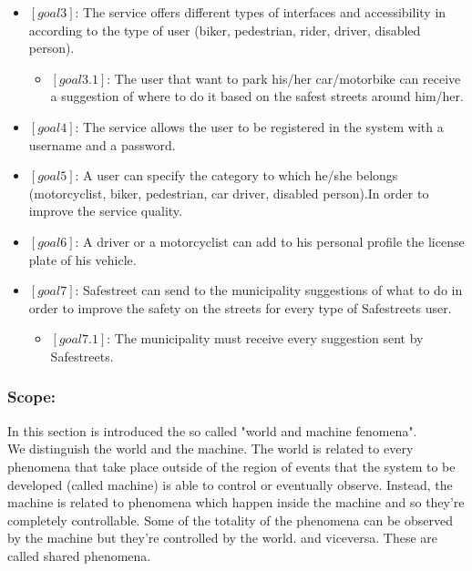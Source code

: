 \documentclass[titlepage]{article}
\begin{document}
\begin{itemize}
\begin{itemize}
      \end{itemize}
\item $[goal 3]$: The service offers different types of 						  interfaces and accessibility in according 					  to the type of user (biker, pedestrian, 						  rider, driver, disabled person).
	\begin{itemize}
	\item $[goal 3.1]$: The user that want to park his/her  							car/motorbike can receive a                           						suggestion of where to do it 
						based on the safest streets around 								him/her.\\
	\end{itemize}

\item $[goal 4]$: The service allows the user to be 							  registered in the system with a username 				  		  and a password.\\

\item $[goal 5]$: A user can specify the category to which 						  he/she belongs (motorcyclist, biker, 							  pedestrian, car driver, disabled person).In 				  order to improve the service quality.\\

\item $[goal 6]$: A driver or a motorcyclist can add to his 					  personal profile the license plate of his 					  vehicle.\\

\item $[goal 7]$: Safestreet can send to the municipality 						  suggestions of what to do in order to 						  improve the safety on the streets for every 
				  type of Safestreets user.
	\begin{itemize}
	\item $[goal 7.1]$: The municipality must receive every 
					    suggestion sent by Safestreets.\\
					   
	
	\end{itemize}

\end{itemize}

\subsubsection{Scope:}
In this section is introduced the so called "world and machine fenomena".\\
We distinguish the world and the machine. The world is related to every phenomena that take place outside of the region of events that the system to be developed (called machine) is able to control or eventually observe. Instead, the machine is related to phenomena which happen inside the machine and so they're completely controllable. Some of the totality of the phenomena can be observed by the machine but they're controlled by the world.  and viceversa. These are called shared phenomena.
\end{document}
